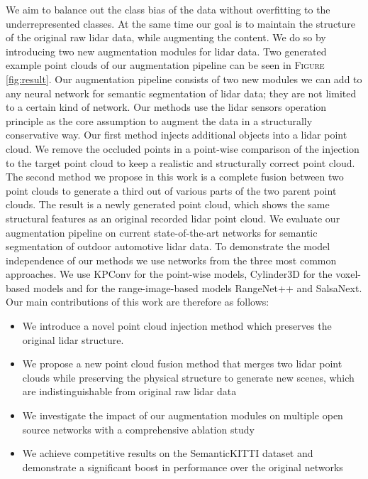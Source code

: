 \documentclass[letterpaper, 10 pt, conference]{ieeeconf}
\begin{document}
We aim to balance out the class bias of the data without overfitting to the underrepresented classes. At the same time our goal is to maintain the structure of the original raw lidar data, while augmenting the content. We do so by introducing two new augmentation modules for lidar data. Two generated example point clouds of our augmentation pipeline can be seen in \textsc{Figure} \ref{fig:result}. Our augmentation pipeline consists of two new modules we can add to any neural network for semantic segmentation of lidar data; they are not limited to a certain kind of network. Our methods use the lidar sensors operation principle as the core assumption to augment the data in a structurally conservative way. Our first method injects additional objects into a lidar point cloud. We remove the occluded points in a point-wise comparison of the injection to the target point cloud to keep a realistic and structurally correct point cloud. The second method we propose in this work is a complete fusion between two point clouds to generate a third out of various parts of the two parent point clouds. The result is a newly generated point cloud, which shows the same structural features as an original recorded lidar point cloud. We evaluate our augmentation pipeline on current state-of-the-art networks for semantic segmentation of outdoor automotive lidar data. To demonstrate the model independence of our methods we use networks from the three most common approaches. We use KPConv\cite{thomas2019kpconv} for the point-wise models, Cylinder3D\cite{zhou2020cylinder3d} for the voxel-based models and for the range-image-based models RangeNet++\cite{milioto2019rangenet++} and SalsaNext\cite{cortinhal2020salsanext}. Our main contributions of this work are therefore as follows:
\begin{itemize}
	\item We introduce a novel point cloud injection method which preserves the original lidar structure.
	\item We propose a new point cloud fusion method that merges two lidar point clouds while preserving the physical structure to generate new scenes, which are indistinguishable from original raw lidar data
	\item We investigate the impact of our augmentation modules on multiple open source networks with a comprehensive ablation study 
	\item We achieve competitive results on the SemanticKITTI dataset and demonstrate a significant boost in performance over the original networks
\end{itemize}
\end{document}
